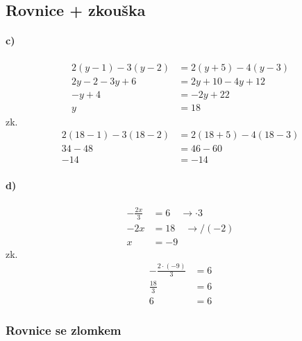 \documentclass[12pt]{article}
\begin{document}
\subsection{Rovnice + zkouška}
\paragraph{c)}
\begin{equation}
\begin{split}
\nonumber
2(y-1)-3(y-2)&=2(y+5)-4(y-3)\\
2y-2-3y+6&=2y+10-4y+12\\
-y+4&=-2y+22\\
y&=18
\end{split}
\end{equation}
zk.
\begin{equation}
\begin{split}
\nonumber
2(18-1)-3(18-2)&=2(18+5)-4(18-3)\\
34-48&=46-60\\
-14&=-14
\end{split}
\end{equation}

\paragraph{d)}
\begin{equation}
\begin{split}
\nonumber
-\frac{2x}{3}&=6 \quad \rightarrow \cdot 3\\
-2x&=18 \quad \rightarrow /(-2)\\
x&=-9
\end{split}
\end{equation}
zk.
\begin{equation}
\begin{split}
\nonumber
-\frac{2\cdot (-9)}{3}&=6\\
\frac{18}{3}&=6\\
6&=6
\end{split}
\end{equation}

\subsubsection{Rovnice se zlomkem}
\end{document}
